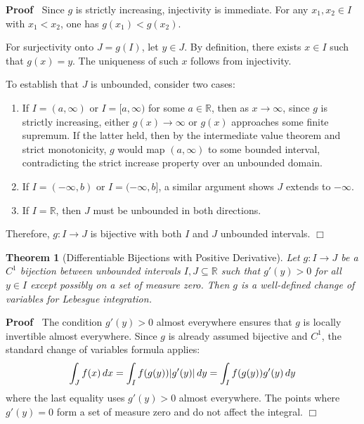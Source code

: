 \documentclass{article}
\newenvironment{proof}{\noindent\textbf{Proof\ }}{\hspace*{\fill}$\Box$\medskip}
\newtheorem{theorem}{Theorem}
\begin{document}
\begin{proof}
  Since $g$ is strictly increasing, injectivity is immediate. For any $x_1,
  x_2 \in I$ with $x_1 < x_2$, one has $g (x_1) < g (x_2)$.
  
  For surjectivity onto $J = g (I)$, let $y \in J$. By definition, there
  exists $x \in I$ such that $g (x) = y$. The uniqueness of such $x$ follows
  from injectivity.
  
  To establish that $J$ is unbounded, consider two cases:
  \begin{enumerate}
    \item If $I = (a, \infty)$ or $I = [a, \infty)$ for some $a \in
    \mathbb{R}$, then as $x \to \infty$, since $g$ is strictly increasing,
    either $g (x) \to \infty$ or $g (x)$ approaches some finite supremum. If
    the latter held, then by the intermediate value theorem and strict
    monotonicity, $g$ would map $(a, \infty)$ to some bounded interval,
    contradicting the strict increase property over an unbounded domain.
    
    \item If $I = (- \infty, b)$ or $I = (- \infty, b]$, a similar argument
    shows $J$ extends to $- \infty$.
    
    \item If $I =\mathbb{R}$, then $J$ must be unbounded in both directions.
  \end{enumerate}
  Therefore, $g : I \to J$ is bijective with both $I$ and $J$ unbounded
  intervals.
\end{proof}

\begin{theorem}[Differentiable Bijections with Positive Derivative]
  \label{thm:diff_bijective}Let $g : I \to J$ be a $C^1$ bijection between
  unbounded intervals $I, J \subseteq \mathbb{R}$ such that $g' (y) > 0$ for
  all $y \in I$ except possibly on a set of measure zero. Then $g$ is a
  well-defined change of variables for Lebesgue integration.
\end{theorem}

\begin{proof}
  The condition $g' (y) > 0$ almost everywhere ensures that $g$ is locally
  invertible almost everywhere. Since $g$ is already assumed bijective and
  $C^1$, the standard change of variables formula applies:
  \begin{equation}
    \label{eq:change_vars} \int_J f (x)  \hspace{0.17em} dx = \int_I f (g (y))
    |g' (y) |  \hspace{0.17em} dy = \int_I f (g (y)) g' (y)  \hspace{0.17em}
    dy
  \end{equation}
  where the last equality uses $g' (y) > 0$ almost everywhere. The points
  where $g' (y) = 0$ form a set of measure zero and do not affect the
  integral.
\end{proof}
\end{document}
